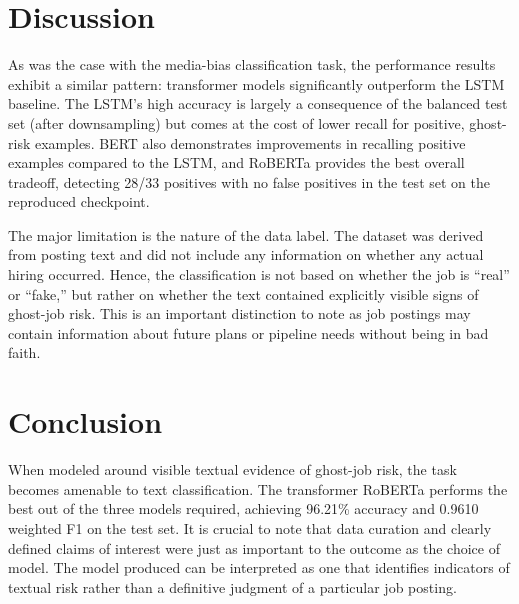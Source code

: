 \documentclass[a4paper,12pt]{report}
\begin{document}
\section{Discussion}
As was the case with the media-bias classification task, the performance results exhibit a similar pattern: transformer models significantly outperform the LSTM baseline. The LSTM's high accuracy is largely a consequence of the balanced test set (after downsampling) but comes at the cost of lower recall for positive, ghost-risk examples. BERT also demonstrates improvements in recalling positive examples compared to the LSTM, and RoBERTa provides the best overall tradeoff, detecting 28/33 positives with no false positives in the test set on the reproduced checkpoint.

The major limitation is the nature of the data label. The dataset was derived from posting text and did not include any information on whether any actual hiring occurred. Hence, the classification is not based on whether the job is ``real'' or ``fake,'' but rather on whether the text contained explicitly visible signs of ghost-job risk. This is an important distinction to note as job postings may contain information about future plans or pipeline needs without being in bad faith.
\newpage

\section{Conclusion}
When modeled around visible textual evidence of ghost-job risk, the task becomes amenable to text classification. The transformer RoBERTa performs the best out of the three models required, achieving 96.21\% accuracy and 0.9610 weighted F1 on the test set. It is crucial to note that data curation and clearly defined claims of interest were just as important to the outcome as the choice of model. The model produced can be interpreted as one that identifies indicators of textual risk rather than a definitive judgment of a particular job posting.

\clearpage
\renewcommand{\bibname}{References}
\end{document}
